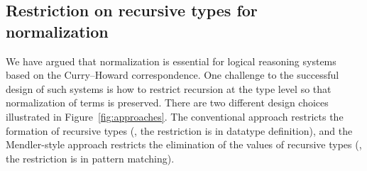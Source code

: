 \subsection{Restriction on recursive types for normalization}
\label{sec:intro:concpets:recursive}
We have argued that normalization is essential for logical reasoning systems
based on the Curry--Howard correspondence. One challenge to the successful
design of such systems is how to restrict recursion at the type level
so that normalization of terms is preserved. 
There are two different
design choices illustrated in Figure~\ref{fig:approaches}. 
The conventional approach restricts the formation
of recursive types (\ie, the restriction is in datatype definition), and
the Mendler-style approach restricts the elimination
of the values of recursive types (\ie, the restriction is in pattern matching).

